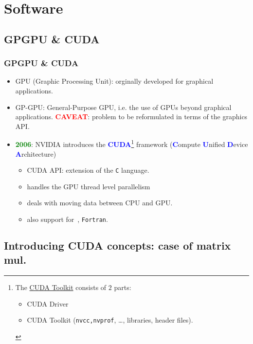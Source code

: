 \section{Software}
\subsection{GPGPU \& CUDA}
\begin{frame}
  \frametitle{GPGPU \& CUDA}
     \begin{itemize}
        \item GPU (Graphic Processing Unit):\newline 
	      orginally developed for graphical applications.
        \item GP-GPU: General-Purpose GPU, i.e.\newline 
	      the use of GPUs beyond graphical applications.\newline
	      \textbf{\textcolor{red}{CAVEAT}}: problem to be reformulated in terms of the graphics API.
      \item \textbf{\textcolor{green}{2006}}: NVIDIA introduces the \textbf{\textcolor{blue}{CUDA}}\footnote{The \href{https://developer.nvidia.com/cuda-downloads}{CUDA Toolkit} consists of $2$ parts: 
      \begin{itemize} 
	      \item CUDA Driver 
	      \item CUDA Toolkit (\texttt{nvcc,nvprof}, \ldots, libraries, header files).
      \end{itemize} } framework\newline 
		(\textbf{\textcolor{blue}{C}}ompute \textbf{\textcolor{blue}{U}}nified 
		     \textbf{\textcolor{blue}{D}}evice \textbf{\textcolor{blue}{A}}rchitecture) 
              \begin{itemize}
	         \item CUDA API: extension of the \texttt{C} language.
                 \item handles the GPU thread level parallelism
                 \item deals with moving data between CPU and GPU.
		 \item also support for \CC\,, \texttt{Fortran}.			 
              \end{itemize}			 
     \end{itemize}		     
\end{frame}	

\subsection{Introducing CUDA concepts: case of matrix mul.}
%         


